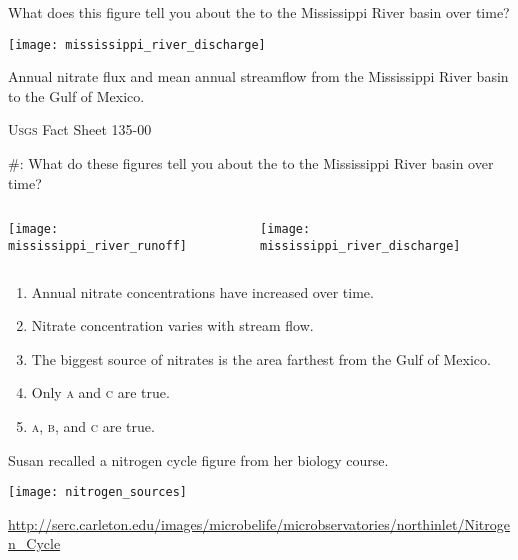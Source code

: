 \documentclass[t]{beamer}
\newcommand*{\cq}[1]{%
	\#{\lining#1}:%
}
\begin{document}
%
\begin{frame}{What does this figure tell you about the  to the Mississippi River basin over time?}

	{\centering\texttt{[image: mississippi\_river\_discharge]}\par
	}
	
	Annual nitrate flux and mean annual streamflow from the Mississippi River basin to the Gulf of Mexico.
	
	\vfilll
	
	\hfill \tiny \textsc{Usgs} Fact Sheet 135-00

\end{frame}
%
\begin{frame}{\cq{4} What do these figures tell you about the  to the Mississippi River basin over time?}

	\vspace*{-\baselineskip}
	\begin{columns}[t]

	
			\texttt{[image: mississippi\_river\_runoff]}

	
			\texttt{[image: mississippi\_river\_discharge]}

	\end{columns}

	\begin{enumerate}[itemsep=1pt]
		\item Annual nitrate concentrations have increased over time.
	
		\item Nitrate concentration varies with stream flow.
	
		\item The biggest source of nitrates is the area farthest from the Gulf of Mexico. 
	
		\item Only \textsc{a} and \textsc{c} are true.
	
		\item \textsc{a}, \textsc{b}, and \textsc{c} are true.

	\end{enumerate}

\end{frame}
%
\begin{frame}{Susan recalled a nitrogen cycle figure from her biology course.}
	
	\texttt{[image: nitrogen\_sources]}
	
	\vfilll
	
	\hfill \tiny \url{http://serc.carleton.edu/images/microbelife/microbservatories/northinlet/Nitrogen_Cycle}

\end{frame}
\end{document}
